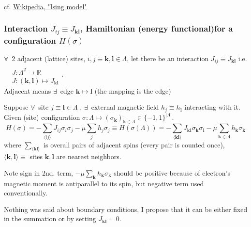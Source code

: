 \documentclass[10pt]{amsart}
\begin{document}
\begin{multicols*}{2}
cf. \href{https://en.wikipedia.org/wiki/Ising_model}{Wikipedia, "Ising model"}

\subsubsection{Interaction $J_{ij} \equiv J_{\mathbf{k} \mathbf{l}}$, Hamiltonian (energy functional)for a configuration $H(\sigma)$}  

$\forall \, $ 2 adjacent (lattice) sites, $i,j \equiv \mathbf{k}, \mathbf{l} \in \Lambda$, let there be an interaction $J_{ij} \equiv J_{\mathbf{k} \mathbf{l}}$ i.e. $\begin{aligned} & \quad \\ 
& J : \Lambda^2 \to \mathbb{R} \\ 
& J: (\mathbf{k}, \mathbf{l}) \mapsto J_{\mathbf{k} \mathbf{l}} \end{aligned}$.   \\
Adjacent means $\exists \, $ edge $\mathbf{k} \mapsto \mathbf{l}$ (the mapping is the edge)  

Suppose $\forall \, $ site $j \equiv \mathbf{l} \in \Lambda$ , $\exists \, $ external magnetic field $h_j \equiv h_{\mathbf{l}}$ interacting with it.  \\
Given (site) configuration $\sigma : \Lambda \mapsto (\sigma_{\mathbf{k}})_{\mathbf{k} \in \Lambda} \in \lbrace -1 ,1 \rbrace^{ | \Lambda | }$.  
\begin{equation}
H(\sigma) = -\sum_{ \langle i j \rangle } J_{ij} \sigma_i \sigma_j - \mu \sum_j h_j \sigma_j \equiv H(\sigma(\Lambda)) = -\sum_{\langle \mathbf{k} \mathbf{l} \rangle } J_{\mathbf{k} \mathbf{l} }\sigma_{\mathbf{k}} \sigma_{\mathbf{l}} - \mu \sum_{ \mathbf{k} \in \Lambda } h_{\mathbf{k}} \sigma_{ \mathbf{k}}
\end{equation}
where $\sum_{ \langle \mathbf{k} \mathbf{l} \rangle }$ is overall pairs of adjacent spins (every pair is counted once),  \\
\phantom{where } $\langle \mathbf{k}, \mathbf{l} \rangle \equiv $ sites $\mathbf{k}, \mathbf{l}$ are nearest neighbors.  

Note sign in 2nd. term, $-\mu \sum_{\mathbf{k}} h_{\mathbf{k}} \sigma_{\mathbf{k}}$ should be positive because of electron's magnetic moment is antiparallel to its spin, but negative term used conventionally.  

Nothing was said about boundary conditions, I propose that it can be either fixed in the summation or by setting $J_{\mathbf{k} \mathbf{l}}=0$.  


\end{multicols*}
\end{document}

